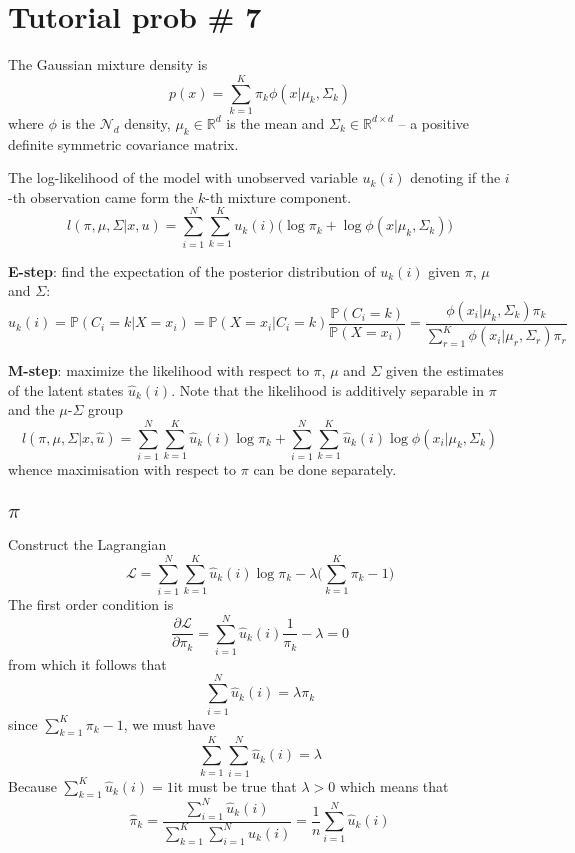 \documentclass[a4paper]{article}
\newcommand{\Real}{\mathbb{R}}
\newcommand{\Ncal}{\mathcal{N}}
\newcommand{\Lcal}{\mathcal{L}}
\newcommand{\pr}[0]{{\mathbb{P}}}
\begin{document}
\section{Tutorial prob \# 7} %
\label{sec:tutorial_prob_7}

The Gaussian mixture density is 
\[p(x) = \sum_{k=1}^K \pi_k \phi(x\lvert \mu_k, \Sigma_k)\]
where $\phi$ is the $\Ncal_d$ density, $\mu_k\in \Real^d$ is the mean and
$\Sigma_k\in\Real^{d\times d}$ -- a positive definite symmetric covariance matrix.

The log-likelihood of the model with unobserved variable $u_k(i)$ denoting
if the $i$-th observation came form the $k$-th mixture component.
\[
l(\pi, \mu, \Sigma\lvert x, u)
= \sum_{i=1}^N \sum_{k=1}^K u_k(i) \bigl(\log \pi_k + \log \phi(x\lvert \mu_k, \Sigma_k)\bigr)
\]

\textbf{E-step}: find the expectation of the posterior distribution of $u_k(i)$ given $\pi$, $\mu$ and $\Sigma$:
\[
\hat{u}_k(i)
= \pr(C_i=k\lvert X=x_i)
= \pr(X=x_i\lvert C_i=k)\frac{\pr(C_i=k)}{\pr(X=x_i)}
= \frac{\phi(x_i\lvert \mu_k, \Sigma_k) \pi_k}{\sum_{r=1}^K \phi(x_i\lvert \mu_r, \Sigma_r) \pi_r}
\]

\textbf{M-step}: maximize the likelihood with respect to $\pi$, $\mu$ and $\Sigma$ given the estimates
of the latent states $\hat{u}_k(i)$. Note that the likelihood is additively separable in $\pi$ and the $\mu$-$\Sigma$ group
\[
l(\pi, \mu, \Sigma\lvert x, \hat{u})
= \sum_{i=1}^N \sum_{k=1}^K \hat{u}_k(i) \log \pi_k + \sum_{i=1}^N \sum_{k=1}^K \hat{u}_k(i)\log \phi(x_i\lvert \mu_k, \Sigma_k)
\]
whence maximisation with respect to $\pi$ can be done separately.

\subsection*{$\pi$} %
\label{sub:_pi_}

Construct the Lagrangian
\[\Lcal = \sum_{i=1}^N \sum_{k=1}^K \hat{u}_k(i) \log \pi_k - \lambda\bigl( \sum_{k=1}^K \pi_k - 1\bigr)\]
The first order condition is
\[\frac{\partial \Lcal}{\partial \pi_k} = \sum_{i=1}^N \hat{u}_k(i) \frac{1}{\pi_k} - \lambda = 0\]
from which it follows that
\[\sum_{i=1}^N \hat{u}_k(i) = \lambda \pi_k\]
since $\sum_{k=1}^K \pi_k - 1$, we must have
\[\sum_{k=1}^K \sum_{i=1}^N \hat{u}_k(i) = \lambda\]
Because $\sum_{k=1}^K \hat{u}_k(i) = 1$it must be true that $\lambda > 0$ which means that
\[
\hat{\pi}_k
= \frac{ \sum_{i=1}^N \hat{u}_k(i) }{ \sum_{k=1}^K \sum_{i=1}^N \hat{u}_k(i) }
= \frac{1}{n} \sum_{i=1}^N \hat{u}_k(i)
\]
\end{document}
